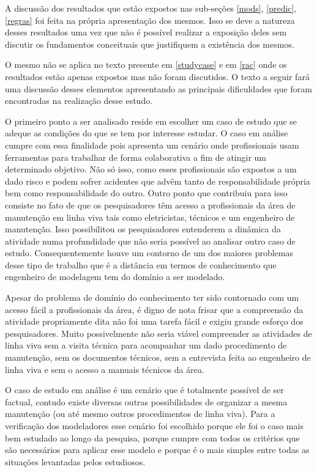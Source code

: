 A discussão dos resultados que estão expostos nas sub-seções \ref{mods}, \ref{predic}, \ref{regras} foi feita na própria apresentação dos mesmos. Isso se deve a natureza desses resultados uma vez que não é possível realizar a exposição deles sem discutir os fundamentos conceituais que justifiquem a existência dos mesmos. 

O mesmo não se aplica no texto presente em \ref{studycase} e em \ref{rac} onde os resultados estão apenas expostos mas não foram discutidos. O texto a seguir fará uma discussão desses elementos apresentando as principais dificuldades que foram encontradas na realização desse estudo. 

O primeiro ponto a ser analisado reside em escolher um caso de estudo que se adeque as condições do que se tem por interesse estudar. O caso em análise cumpre com essa finalidade pois apresenta um cenário onde profissionais usam ferramentas para trabalhar de forma colaborativa a fim de atingir um determinado objetivo. Não só isso, como esses profissionais são expostos a um dado risco e podem sofrer acidentes que advêm tanto de responsabilidade própria bem como responsabilidade do outro. Outro ponto que contribuiu para isso consiste no fato de que os pesquisadores têm acesso a profissionais da área de manutenção em linha viva tais como eletricistas, técnicos e um engenheiro de manutenção. Isso possibilitou os pesquisadores entenderem a dinâmica da atividade numa profundidade que não seria possível ao analisar outro caso de estudo. Consequentemente houve um contorno de um dos maiores problemas desse tipo de trabalho que é a distância em termos de conhecimento que engenheiro de modelagem tem do domínio a ser modelado. 

Apesar do problema de domínio do conhecimento ter sido contornado com um acesso fácil a profissionais da área, é digno de nota frisar que a compreensão da atividade propriamente dita não foi uma tarefa fácil e exigiu grande esforço dos pesquisadores. Muito possivelmente não seria viável compreender as atividades de linha viva sem a visita técnica para acompanhar um dado procedimento de manutenção, sem os documentos técnicos, sem a entrevista feita ao engenheiro de linha viva e sem o acesso a manuais técnicos da área. 

O caso de estudo em análise é um cenário que é totalmente possível de ser factual, contudo existe diversas outras possibilidades de organizar a mesma manutenção (ou até mesmo outros procedimentos de linha viva). Para a verificação dos modeladores esse cenário foi escolhido porque ele foi o caso mais bem estudado ao longo da pesquisa, porque cumpre com todos os critérios  que são necessários para aplicar esse modelo e porque é o mais simples entre todas as situações levantadas pelos estudiosos.

